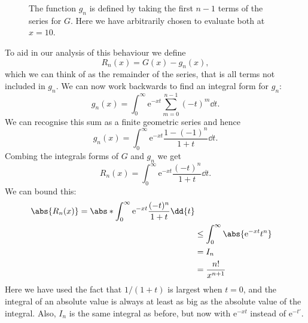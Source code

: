 \documentclass[fleqn]{NotesClass}
\newcommand*{\e}{\mathrm{e}}
\begin{document}
    \begin{figure}
        \caption{The function \(g_n\) is defined by taking the first \(n-1\) terms of the series for \(G\). Here we have arbitrarily chosen to evaluate both at \(x = 10\).}
        \label{fig:asymptotic expansion}
    \end{figure}
    
    To aid in our analysis of this behaviour we define
    \begin{equation}
        R_n(x) = G(x) - g_n(x),
    \end{equation}
    which we can think of as the remainder of the series, that is all terms not included in \(g_n\).
    We can now work backwards to find an integral form for \(g_n\):
    \begin{equation}
        g_n(x) = \int_0^{\infty} \e^{-xt}\sum_{m=0}^{n-1} (-t)^{m}\dd{t}.
    \end{equation}
    We can recognise this sum as a finite geometric series and hence
    \begin{equation}
        g_n(x) = \int_0^{\infty} \e^{-xt} \frac{1 - (-1)^n}{1 + t}\dd{t}.
    \end{equation}
    Combing the integrals forms of \(G\) and \(g_n\) we get
    \begin{equation}
        R_n(x) = \int_0^{\infty} \e^{-xt} \frac{(-t)^n}{1 + t}\dd{t}.
    \end{equation}
    We can bound this:
    \begin{align}
        \abs{R_n(x)} = \abs*{\int_0^{\infty} \e^{-xt} \frac{(-t)^n}{1 + t}\dd{t}}\\
        &\le \int_0^{\infty} \abs{\e^{-xt}t^n}\\
        &= I_n\\
        &= \frac{n!}{x^{n+1}}
    \end{align}
    Here we have used the fact that \(1/(1 + t)\) is largest when \(t = 0\), and the integral of an absolute value is always at least as big as the absolute value of the integral.
    Also, \(I_n\) is the same integral as before, but now with \(\e^{-xt}\) instead of \(\e^{-t'}\).
    
\end{document}
